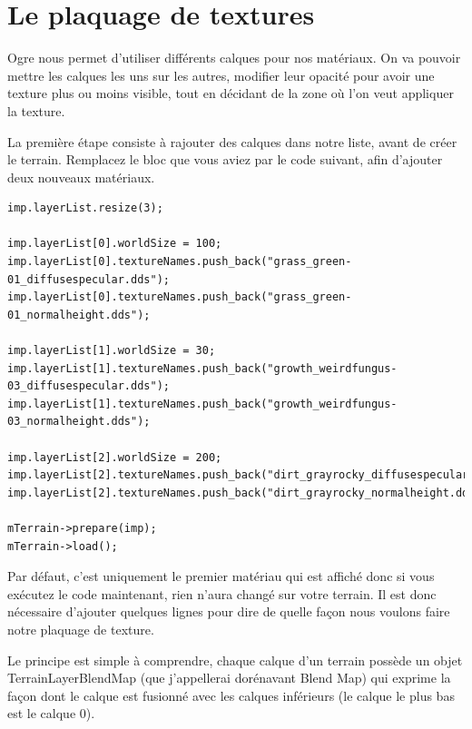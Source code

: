 \documentclass[10pt,a4paper]{report}
\begin{document}


\section{Le plaquage de textures}


Ogre nous permet d'utiliser diff\'erents calques pour nos mat\'eriaux. On va pouvoir mettre les calques les uns sur les autres, modifier leur opacit\'e pour avoir une texture plus ou moins visible, tout en d\'ecidant de la zone o\`u l'on veut appliquer la texture.

La premi\`ere \'etape consiste \`a rajouter des calques dans notre liste, avant de cr\'eer le terrain. Remplacez le bloc que vous aviez par le code suivant, afin d'ajouter deux nouveaux mat\'eriaux.



\begin{lstlisting}[caption={Ajout de calques}]
imp.layerList.resize(3);

imp.layerList[0].worldSize = 100;
imp.layerList[0].textureNames.push_back("grass_green-01_diffusespecular.dds");
imp.layerList[0].textureNames.push_back("grass_green-01_normalheight.dds");

imp.layerList[1].worldSize = 30;
imp.layerList[1].textureNames.push_back("growth_weirdfungus-03_diffusespecular.dds");
imp.layerList[1].textureNames.push_back("growth_weirdfungus-03_normalheight.dds");

imp.layerList[2].worldSize = 200;
imp.layerList[2].textureNames.push_back("dirt_grayrocky_diffusespecular.dds");
imp.layerList[2].textureNames.push_back("dirt_grayrocky_normalheight.dds");

mTerrain->prepare(imp);
mTerrain->load();
\end{lstlisting}

Par d\'efaut, c'est uniquement le premier mat\'eriau qui est affich\'e donc si vous ex\'ecutez le code maintenant, rien n'aura chang\'e sur votre terrain.  Il est donc n\'ecessaire d'ajouter quelques lignes pour dire de quelle fa\c{c}on nous voulons faire notre plaquage de texture.\newline

Le principe est simple \`a comprendre, chaque calque d'un terrain poss\`ede un objet TerrainLayerBlendMap (que j'appellerai dor\'enavant Blend Map) qui exprime la fa\c{c}on dont le calque est fusionn\'e avec les calques inf\'erieurs (le calque le plus bas est le calque 0).
\end{document}
